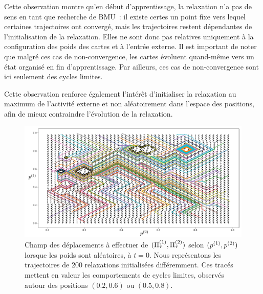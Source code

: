 \documentclass[../main]{subfiles}
\begin{document}
Cette observation montre qu'en début d'apprentissage, la relaxation n'a pas de sens en tant que recherche de BMU~: il existe certes un point fixe vers lequel certaines trajectoires ont convergé, mais les trajectoires restent dépendantes de l'initialisation de la relaxation. 
Elles ne sont donc pas relatives uniquement à la configuration des poids des cartes et à l'entrée externe.
Il est important de noter que malgré ces cas de non-convergence, les cartes évoluent quand-même vers un état organisé en fin d'apprentissage. Par ailleurs, ces cas de non-convergence sont ici seulement des cycles limites.

Cette observation renforce également l'intérêt d'initialiser la relaxation au maximum de l'activité externe et non aléatoirement dans l'espace des positions, afin de mieux contraindre l'évolution de la relaxation.

	\begin{figure}
		\centering
		\includegraphics[width=\textwidth]{champ_006_t1.pdf}
		\caption{Champ des déplacements à effectuer de $(\Pi^{({1})}_\tau, \Pi^{({2})}_\tau)$ selon $(p^{({1})}, p^{({2})})$ lorsque les poids sont aléatoires, à $t=0$. Nous représentons les trajectoires de 200 relaxations initialisées différemment. Ces tracés mettent en valeur les comportements de cycles limites, observés autour des positions $(0.2, 0.6)$ ou $(0.5, 0.8)$.}
		\label{fig:champ_0}
		\end{figure}
		
\end{document}
